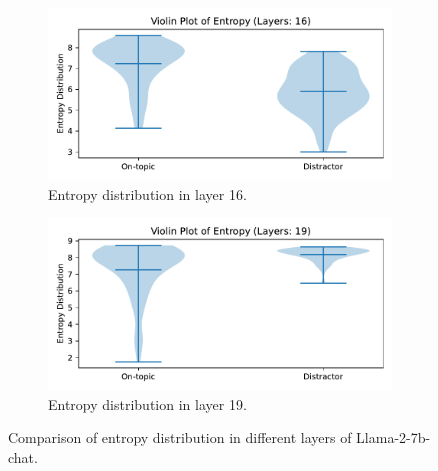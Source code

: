 \documentclass[11pt]{article}
\begin{document}
\begin{figure}[t]
    \centering
    \begin{subfigure}{0.5\textwidth}
        \centering
        \includegraphics[width=\linewidth]{latex/figures/violin_plot_16.pdf}
        \caption{Entropy distribution in layer 16.}
        \label{fig:entropy_violin_16}
    \end{subfigure}
    \hfill
    \begin{subfigure}{0.5\textwidth}
        \centering
        \includegraphics[width=\linewidth]{latex/figures/violin_plot_19.pdf}
        \caption{Entropy distribution in layer 19.}
        \label{fig:entropy_violin_19}
    \end{subfigure}
    \caption{Comparison of entropy distribution in different layers of Llama-2-7b-chat.}
    \label{fig:entropy_violin}
\end{figure}
\end{document}
